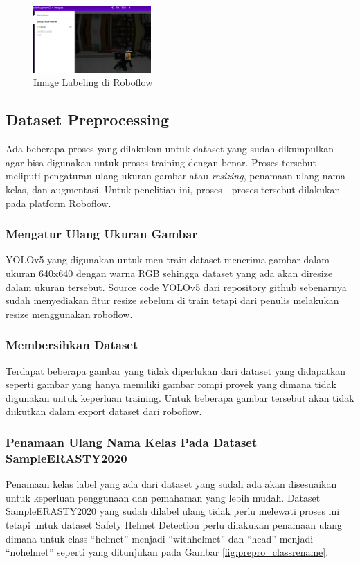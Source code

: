 \begin{figure}[ht]
  \centering
  \includegraphics[width=0.4\textwidth]{gambar/utilities/labeldiroboflow.png}
  \caption{Image Labeling di Roboflow}
  \label{fig:gambarbesertalabel}  
\end{figure}

\subsection{Dataset Preprocessing}
\label{subsec:dataset_preprocessing}

\par Ada beberapa proses yang dilakukan untuk dataset yang sudah dikumpulkan agar bisa digunakan untuk proses training dengan benar. Proses tersebut meliputi pengaturan ulang ukuran gambar atau \emph{resizing}, penamaan ulang nama kelas, dan augmentasi. Untuk penelitian ini, proses - proses tersebut dilakukan pada platform Roboflow.

\subsubsection{Mengatur Ulang Ukuran Gambar}
\label{subsec:imageresize}
\par YOLOv5 yang digunakan untuk men-train dataset menerima gambar dalam ukuran 640x640 dengan warna RGB sehingga dataset yang ada akan diresize dalam ukuran tersebut. Source code YOLOv5 dari repository github sebenarnya sudah menyediakan fitur resize sebelum di train tetapi dari penulis melakukan resize menggunakan roboflow.  

\subsubsection{Membersihkan Dataset}
\label{subsec:datasetcleanup}
\par Terdapat beberapa gambar yang tidak diperlukan dari dataset yang didapatkan seperti gambar yang hanya memiliki gambar rompi proyek yang dimana tidak digunakan untuk keperluan training. Untuk beberapa gambar tersebut akan tidak diikutkan dalam export dataset dari roboflow.

\subsubsection{Penamaan Ulang Nama Kelas Pada Dataset SampleERASTY2020}
\label{subsec:classrename}
\par Penamaan kelas  label yang ada dari dataset yang sudah ada akan disesuaikan untuk keperluan penggunaan dan pemahaman yang lebih mudah. Dataset SampleERASTY2020 yang sudah dilabel ulang tidak perlu melewati proses ini tetapi untuk dataset Safety Helmet Detection perlu dilakukan penamaan ulang dimana untuk class “helmet” menjadi “with\textunderscore helmet” dan “head” menjadi “no\textunderscore helmet” seperti yang ditunjukan pada Gambar \ref{fig:prepro_classrename}. 

